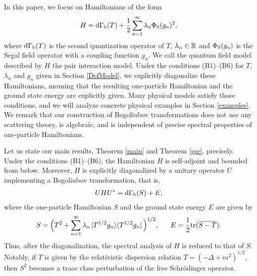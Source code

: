 \documentclass[12pt]{article}
\theoremstyle{plain}
\numberwithin{equation}{section}
\theoremstyle{remark}
\begin{document}
In this paper, we focus on Hamiltonians of the form
\begin{align*}
  H = \mathrm{d\Gamma_b}(T) + \frac{1}{2}\sum_{n=1}^\infty \lambda_n \Phi_\mathrm{S}(g_n)^2,
\end{align*}
where $\mathrm{d\Gamma_b}(T)$ is the second quantization operator of $T$, 
$\lambda_n\in\mathbb{R}$ and $\Phi_\mathrm{S}(g_n)$ is the Segal field operator with a coupling function $g_n$.
We call the quantum field model described by $H$ the pair interaction model.
Under the conditions (B1)--(B6) for $T$, $\lambda_n$ and $g_n$ given in Section \ref{DefModel},
we explicitly diagonalize these Hamiltonians, meaning that the resulting one-particle Hamiltonian
 and the ground state energy are explicitly given.
Many physical models satisfy those conditions, and 
we will analyze concrete physical examples in Section \ref{examples}.
We remark that our construction of Bogoliubov transformations does not use any scattering theory, is algebraic, 
and is independent of precise spectral properties of one-particle Hamiltonians.


Let us state our main results, Theorem \ref{main} and Theorem \ref{gse}, precisely.
Under the conditions (B1)--(B6), the Hamiltonian $H$ is self-adjoint and bounded from below.
Moreover, $H$ is explicitly diagonalized 
by a unitary operator $U$ implementing a Bogoliubov transformation, that is, 
\begin{align*}
  UHU^* = \mathrm{d\Gamma_b}(S) + E,
\end{align*}
where the one-particle Hamiltonian $S$ and the ground state energy $E$ are given by
\[
S = \Big(T^2+\sum_{n=1}^\infty \lambda_n \ket{T^{1/2}g_n}\!\bra{T^{1/2}g_n}\Big)^{1/2},\ \ \ \ \ 
E = \frac{1}{2} \mathrm{tr}(\overline{S-T}).
\]
Thus, after the diagonalization, the spectral analysis of $H$ is reduced to 
that of $S$.
Notably, if $T$ is given by the relativistic dispersion relation $T=(-\Delta+m^2)^{1/2}$, 
then $S^2$ becomes a trace class perturbation of the free Schr\"odinger operator.
\end{document}
